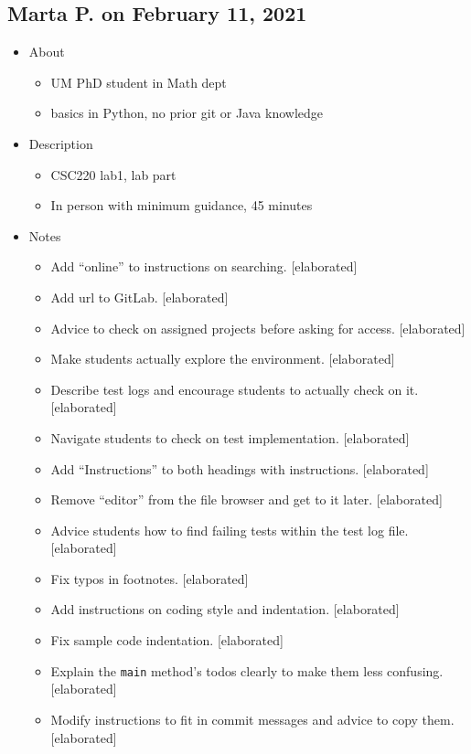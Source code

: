 \subsection{Marta P. on February 11, 2021}\label{ssec:marta0211}

\begin{itemize}
\item
  {About}
  \begin{itemize}
  \item
    {UM PhD student in Math dept}
  \item
    {basics in Python, no prior git or Java knowledge}
  \end{itemize}

\item
  {Description}
  \begin{itemize}
  \item
    {CSC220 lab1, lab part}
  \item
    {In person with minimum guidance, 45 minutes}
  \end{itemize}

\item
  {Notes}
  \begin{itemize}
  \item
    {Add ``online'' to instructions on searching. {[}elaborated{]}}
  \item
    {Add url to GitLab. {[}elaborated{]}}
  \item
    {Advice to check on assigned projects before asking for access. {[}elaborated{]}}
  \item
    {Make students actually explore the environment. {[}elaborated{]}}
  \item
    {Describe test logs and encourage students to actually check on it. {[}elaborated{]}}
  \item
    {Navigate students to check on test implementation. {[}elaborated{]}}
  \item
    {Add ``Instructions'' to both headings with instructions. {[}elaborated{]}}
  \item
    {Remove ``editor'' from the file browser and get to it later. {[}elaborated{]}}
  \item
    {Advice students how to find failing tests within the test log file. {[}elaborated{]}}
  \item
    {Fix typos in footnotes. {[}elaborated{]}}
  \item
    {Add instructions on coding style and indentation. {[}elaborated{]}}
  \item
    {Fix sample code indentation. {[}elaborated{]}}
  \item
    {Explain the \texttt{main} method's todos clearly to make them less confusing. {[}elaborated{]}}
  \item
    {Modify instructions to fit in commit messages and advice to copy them. {[}elaborated{]}}
  \end{itemize}


\end{itemize}
